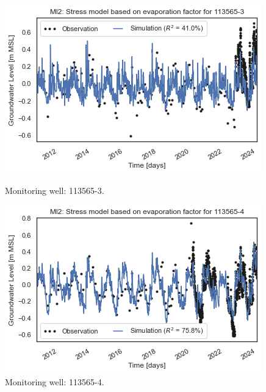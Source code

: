 \begin{figure}[htbp]
    \centering
    \begin{minipage}{0.32\textwidth}
        \centering
        \includegraphics[width=\linewidth]{frontmatter/Rozenburg-fig/1135653.png}
        \caption{Monitoring well: 113565-3.}
        \label{fig:113565-3}
    \end{minipage}
    \hfill
    \begin{minipage}{0.32\textwidth}
        \centering
        \includegraphics[width=\linewidth]{frontmatter/Rozenburg-fig/1135654.png}
        \caption{Monitoring well: 113565-4.}
        \label{fig:113565-4}
    \end{minipage}
    \hfill
    \begin{minipage}{0.32\textwidth}
        \centering

\end{minipage}
\end{figure}
